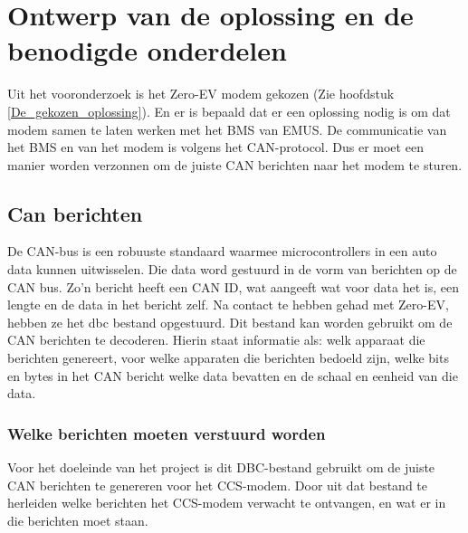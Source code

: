 \chapter{Ontwerp van de oplossing en de benodigde onderdelen}
\label{Ontwerp_van_de_oplossing_en_de_benodigde_onderdelen}

Uit het vooronderzoek is het Zero-EV modem gekozen (Zie hoofdstuk
\ref{De_gekozen_oplossing}). En er is bepaald dat er een oplossing nodig is om
dat modem samen te laten werken met het BMS van EMUS. De communicatie van het
BMS en van het modem is volgens het CAN-protocol. Dus er moet een manier worden
verzonnen om de juiste CAN berichten naar het modem te sturen.

\section{Can berichten}

De CAN-bus is een robuuste standaard waarmee microcontrollers in een auto data
kunnen uitwisselen. Die data word gestuurd in de vorm van berichten op de CAN
bus. Zo'n bericht heeft een CAN ID, wat aangeeft wat voor data het is, een
lengte en de data in het bericht zelf. Na contact te hebben gehad met Zero-EV,
hebben ze het \ac{dbc} bestand opgestuurd. Dit bestand kan worden gebruikt om
de CAN berichten te decoderen. Hierin staat informatie als: welk apparaat die
berichten genereert, voor welke apparaten die berichten bedoeld zijn, welke
bits en bytes in het CAN bericht welke data bevatten en de schaal en eenheid
van die data. \cite{DBC_File_Database_Intro}

\subsection{Welke berichten moeten verstuurd worden}

Voor het doeleinde van het project is dit DBC-bestand gebruikt om de juiste CAN
berichten te genereren voor het CCS-modem. Door uit dat bestand te herleiden
welke berichten het CCS-modem verwacht te ontvangen, en wat er in die berichten
moet staan.

